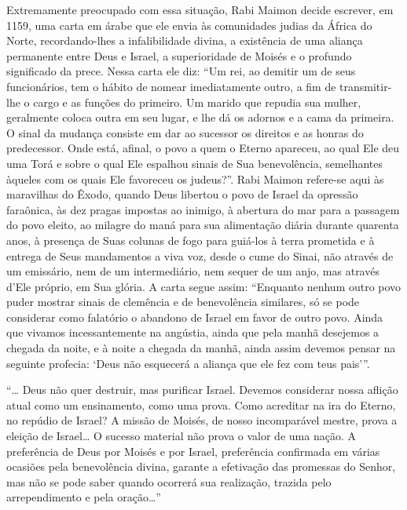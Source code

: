 Extremamente preocupado com essa situação, Rabi Maimon decide escrever,
em 1159, uma carta em árabe que ele envia às comunidades judias da
África do Norte, recordando-lhes a infalibilidade divina, a existência
de uma aliança permanente entre Deus e Israel, a superioridade de Moisés
e o profundo significado da prece. Nessa carta ele diz: ``Um rei, ao
demitir um de seus funcionários, tem o hábito de nomear imediatamente
outro, a fim de transmitir-lhe o cargo e as funções do primeiro. Um
marido que repudia sua mulher, geralmente coloca outra em seu lugar, e
lhe dá os adornos e a cama da primeira. O sinal da mudança consiste em
dar ao sucessor os direitos e as honras do predecessor. Onde está,
afinal, o povo a quem o Eterno apareceu, ao qual Ele deu uma
Torá e sobre o qual Ele espalhou sinais de Sua benevolência,
semelhantes àqueles com os quais Ele favoreceu os judeus?''. Rabi
Maimon refere-se aqui às maravilhas do Êxodo, quando Deus libertou o
povo de Israel da opressão faraônica, às dez pragas impostas ao inimigo,
à abertura do mar para a passagem do povo eleito, ao milagre do maná
para sua alimentação diária durante quarenta anos, à presença de Suas
colunas de fogo para guiá-los à terra prometida e à entrega de Seus
mandamentos a viva voz, desde o cume do Sinai, não através de um
emissário, nem de um intermediário, nem sequer de um anjo, mas através
d'Ele próprio, em Sua glória. A carta segue assim: ``Enquanto nenhum
outro povo puder mostrar sinais de clemência e de benevolência
similares, só se pode considerar como falatório o abandono de Israel em
favor de outro povo. Ainda que vivamos incessantemente na angústia,
ainda que pela manhã desejemos a chegada da noite, e à noite a chegada
da manhã, ainda assim devemos pensar na seguinte profecia: `Deus não
esquecerá a aliança que ele fez com teus pais'''.

``\ldots{} Deus não quer destruir, mas purificar Israel. Devemos considerar
nossa aflição atual como um ensinamento, como uma prova. Como acreditar
na ira do Eterno, no repúdio de Israel? A missão de Moisés, de nosso
incomparável mestre, prova a eleição de Israel\ldots{} O sucesso material
não prova o valor de uma nação. A preferência de Deus por Moisés e por
Israel, preferência confirmada em várias ocasiões pela benevolência
divina, garante a efetivação das promessas do Senhor, mas não se pode
saber quando ocorrerá sua realização, trazida pelo arrependimento e
pela oração\ldots{}''

